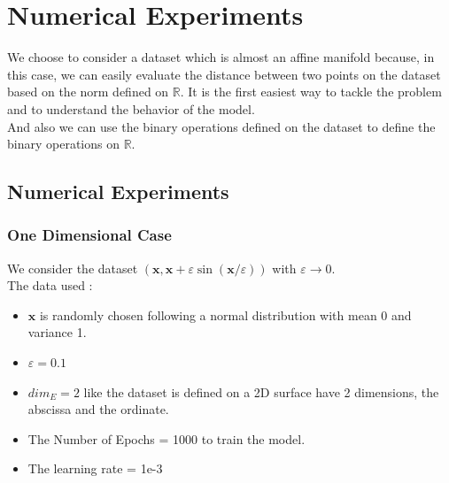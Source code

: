 \documentclass{report}
\begin{document}
\section{Numerical Experiments}
    We choose to consider a dataset  which is almost an affine manifold because, in this case, we can easily evaluate the distance between two points on the dataset based on the norm defined on $\mathbb{R}$. It is the first easiest way to tackle the problem and to understand the behavior of the model.\\
    And also we can use the binary operations defined on the dataset to define the binary operations on $\mathbb{R}$.

    \subsection{Numerical Experiments}
        \subsubsection{One Dimensional Case}
            We consider the dataset $(\mathbf{x}, \mathbf{x}+\varepsilon \sin (\mathbf{x} / \varepsilon))$ with $\varepsilon \rightarrow 0$.
            \\
            The data used :
            \begin{itemize}
                \item $\mathbf{x}$ is randomly chosen following a normal distribution with mean 0 and variance 1.
                \item $\varepsilon = 0.1$
                \item  $dim_E = 2$ like the dataset is defined on a 2D 
                        surface have 2 dimensions, the abscissa and the ordinate.
                \item The Number of Epochs = 1000  to train the model.
                \item The learning rate = 1e-3
            \end{itemize}
\end{document}
